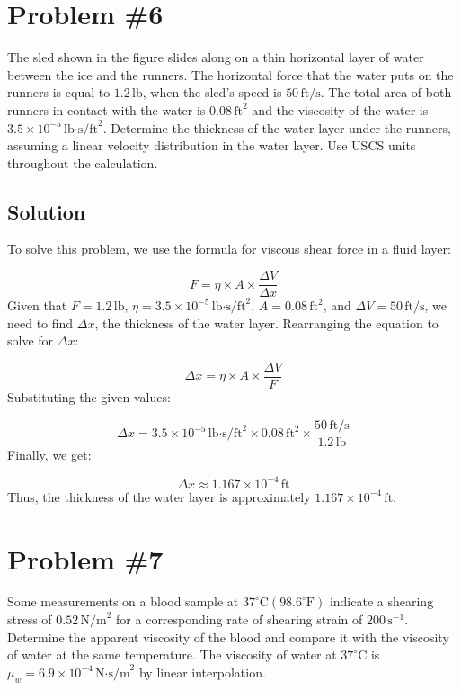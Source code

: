 \documentclass{article}
\begin{document}
\newpage
\section*{Problem \#6}
The sled shown in the figure slides along on a thin horizontal layer of water between the ice and the runners. The horizontal force that the water puts on the runners is equal to \(1.2 \, \text{lb}\), when the sled's speed is \(50 \, \text{ft/s}\). The total area of both runners in contact with the water is \(0.08 \, \text{ft}^2\) and the viscosity of the water is \(3.5 \times 10^{-5} \, \text{lb·s/ft}^2\). Determine the thickness of the water layer under the runners, assuming a linear velocity distribution in the water layer. Use USCS units throughout the calculation.

\subsection*{Solution}
To solve this problem, we use the formula for viscous shear force in a fluid layer:

\[
F = \eta \times A \times \frac{\Delta V}{\Delta x}
\]
Given that \( F = 1.2 \, \text{lb}\), \( \eta = 3.5 \times 10^{-5} \, \text{lb·s/ft}^2\), \( A = 0.08 \, \text{ft}^2\), and \( \Delta V = 50 \, \text{ft/s}\), we need to find \( \Delta x \), the thickness of the water layer.
Rearranging the equation to solve for \( \Delta x \):

\[
\Delta x = \eta \times A \times \frac{\Delta V}{F}
\]
Substituting the given values:

\[
\Delta x = 3.5 \times 10^{-5} \, \text{lb·s/ft}^2 \times 0.08 \, \text{ft}^2 \times \frac{50 \, \text{ft/s}}{1.2 \, \text{lb}}
\]
Finally, we get:

\[
\Delta x \approx 1.167 \times 10^{-4} \, \text{ft}
\]
Thus, the thickness of the water layer is approximately \( 1.167 \times 10^{-4} \, \text{ft}\).
\newpage
\section*{Problem \#7}
Some measurements on a blood sample at \(37^\circ \text{C} (98.6^\circ \text{F})\) indicate a shearing stress of \(0.52 \, \text{N/m}^2\) for a corresponding rate of shearing strain of \(200 \, \text{s}^{-1}\). Determine the apparent viscosity of the blood and compare it with the viscosity of water at the same temperature. The viscosity of water at \(37^\circ \text{C}\) is \( \mu_w = 6.9 \times 10^{-4} \, \text{N·s/m}^2\) by linear interpolation.
\end{document}
